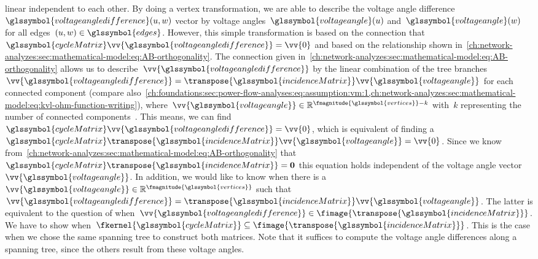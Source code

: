 linear independent to each other. By doing a vertex transformation, we are able
to describe the voltage angle difference~$\glssymbol{voltageangledifference}
(\vertexa,\vertexc)$ vector by voltage angles~$\glssymbol{voltageangle}
(\vertexa)$ and~$\glssymbol{voltageangle}(\vertexc)$ for all
edges~$(\vertexa,\vertexc)\in\glssymbol{edges}$. However, this simple
transformation is based on the connection
that~$
    \glssymbol{cycleMatrix}
    \vv{\glssymbol{voltageangledifference}} 
    = 
    \vv{0}
$ and based on the relationship shown
in~\cref{ch:network-analyzes:sec:mathematical-model:eq:AB-orthogonality}.
% 
The connection given
in~\cref{ch:network-analyzes:sec:mathematical-model:eq:AB-orthogonality} allows
us to describe~$\vv{\glssymbol{voltageangledifference}}$ by the
linear combination of the tree branches~$
    \vv{\glssymbol{voltageangledifference}} 
    =
    \transpose{\glssymbol{incidenceMatrix}}
    \vv{\glssymbol{voltageangle}}
$ for each connected component (compare
also~\cref{ch:foundations:sec:power-flow-analyses:eq:assumption:vm:1,ch:network-analyzes:sec:mathematical-model:eq:kvl-ohm-function-writing}),
where~$
    \vv{\glssymbol{voltageangle}}
    \in 
    \reals^{\fmagnitude{\glssymbol{vertices}}-k}
$ with~$k$ representing the number of connected components~\parencite[Theorem
6-6, p. 123]{Ses61}. This means, we can find~$
    \glssymbol{cycleMatrix}
    \vv{\glssymbol{voltageangledifference}} 
    = 
    \vv{0}
$, which is equivalent of finding a~$
    \glssymbol{cycleMatrix}
    \transpose{\glssymbol{incidenceMatrix}}
    \vv{\glssymbol{voltageangle}} 
    = 
    \vv{0}
$. Since we know
from~\cref{ch:network-analyzes:sec:mathematical-model:eq:AB-orthogonality}
that~$
    \glssymbol{cycleMatrix}
    \transpose{\glssymbol{incidenceMatrix}} 
    =
    \mathbf{0}
$ this equation holds independent of the voltage angle
vector~$\vv{\glssymbol{voltageangle}}$. In addition, we would like to know when
there is a~$
    \vv{\glssymbol{voltageangle}}
    \in
    \reals^{
        \fmagnitude{\glssymbol{vertices}}
    }
$ such that~$
    \vv{\glssymbol{voltageangledifference}} 
    = 
    \transpose{
        \glssymbol{incidenceMatrix}
    }
    \vv{\glssymbol{voltageangle}}
$. The latter is equivalent to the question of when~$
    \vv{\glssymbol{voltageangledifference}}
    \in
    \fimage{
        \transpose{\glssymbol{incidenceMatrix}}
    }
$. We have to show when~$
    \fkernel{\glssymbol{cycleMatrix}}
    \subseteq
    \fimage{\transpose{\glssymbol{incidenceMatrix}}}
$. This is the case when we chose the same spanning tree to construct both
matrices. Note that it suffices to compute the voltage angle differences along
a spanning tree, since the others result from these voltage angles.
% 
